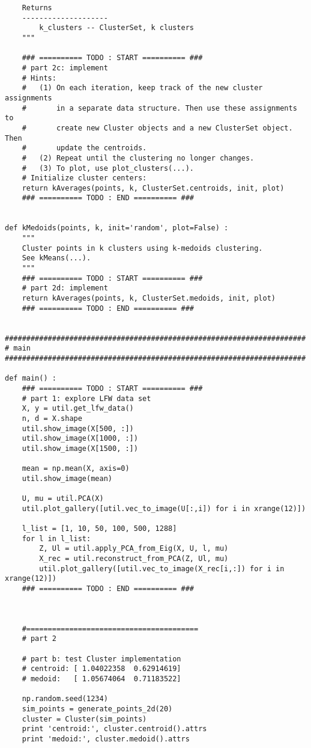 \documentclass[11pt]{article}
\begin{document}
\begin{verbatim}
    Returns
    --------------------
        k_clusters -- ClusterSet, k clusters
    """
    
    ### ========== TODO : START ========== ###
    # part 2c: implement
    # Hints:
    #   (1) On each iteration, keep track of the new cluster assignments
    #       in a separate data structure. Then use these assignments to 
    #       create new Cluster objects and a new ClusterSet object. Then
    #       update the centroids.
    #   (2) Repeat until the clustering no longer changes.
    #   (3) To plot, use plot_clusters(...).
    # Initialize cluster centers:
    return kAverages(points, k, ClusterSet.centroids, init, plot)
    ### ========== TODO : END ========== ###


def kMedoids(points, k, init='random', plot=False) :
    """
    Cluster points in k clusters using k-medoids clustering.
    See kMeans(...).
    """
    ### ========== TODO : START ========== ###
    # part 2d: implement
    return kAverages(points, k, ClusterSet.medoids, init, plot)
    ### ========== TODO : END ========== ###


######################################################################
# main
######################################################################

def main() :
    ### ========== TODO : START ========== ###
    # part 1: explore LFW data set
    X, y = util.get_lfw_data()
    n, d = X.shape
    util.show_image(X[500, :])
    util.show_image(X[1000, :])
    util.show_image(X[1500, :])

    mean = np.mean(X, axis=0)
    util.show_image(mean)

    U, mu = util.PCA(X)
    util.plot_gallery([util.vec_to_image(U[:,i]) for i in xrange(12)])

    l_list = [1, 10, 50, 100, 500, 1288]
    for l in l_list:
        Z, Ul = util.apply_PCA_from_Eig(X, U, l, mu)
        X_rec = util.reconstruct_from_PCA(Z, Ul, mu)
        util.plot_gallery([util.vec_to_image(X_rec[i,:]) for i in xrange(12)])
    ### ========== TODO : END ========== ###
    
    
    
    #========================================
    # part 2
    
    # part b: test Cluster implementation    
    # centroid: [ 1.04022358  0.62914619]
    # medoid:   [ 1.05674064  0.71183522]
    
    np.random.seed(1234)
    sim_points = generate_points_2d(20)
    cluster = Cluster(sim_points)
    print 'centroid:', cluster.centroid().attrs
    print 'medoid:', cluster.medoid().attrs
    

\end{verbatim}
\end{document}
